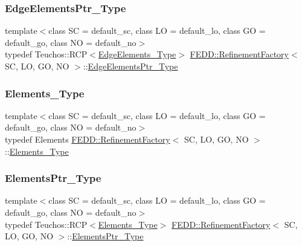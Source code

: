\subsubsection{\texorpdfstring{Edge\+Elements\+Ptr\+\_\+\+Type}{EdgeElementsPtr\_Type}}
{\footnotesize\ttfamily template$<$class SC = default\+\_\+sc, class LO = default\+\_\+lo, class GO = default\+\_\+go, class NO = default\+\_\+no$>$ \\
typedef Teuchos\+::\+R\+CP$<$\hyperlink{classFEDD_1_1RefinementFactory_a11b30196ff403358f3540117f09b6963}{Edge\+Elements\+\_\+\+Type}$>$ \hyperlink{classFEDD_1_1RefinementFactory}{F\+E\+D\+D\+::\+Refinement\+Factory}$<$ SC, LO, GO, NO $>$\+::\hyperlink{classFEDD_1_1RefinementFactory_ae5285e990ec4632d6188a1280627ad13}{Edge\+Elements\+Ptr\+\_\+\+Type}}

\mbox{\label{classFEDD_1_1RefinementFactory_a0879b04ac1b1830fae7d6a7e29d36000}} 
\subsubsection{\texorpdfstring{Elements\+\_\+\+Type}{Elements\_Type}}
{\footnotesize\ttfamily template$<$class SC = default\+\_\+sc, class LO = default\+\_\+lo, class GO = default\+\_\+go, class NO = default\+\_\+no$>$ \\
typedef Elements \hyperlink{classFEDD_1_1RefinementFactory}{F\+E\+D\+D\+::\+Refinement\+Factory}$<$ SC, LO, GO, NO $>$\+::\hyperlink{classFEDD_1_1RefinementFactory_a0879b04ac1b1830fae7d6a7e29d36000}{Elements\+\_\+\+Type}}

\mbox{\label{classFEDD_1_1RefinementFactory_a0994b5b7b6d080048673941251999f2e}} 
\subsubsection{\texorpdfstring{Elements\+Ptr\+\_\+\+Type}{ElementsPtr\_Type}}
{\footnotesize\ttfamily template$<$class SC = default\+\_\+sc, class LO = default\+\_\+lo, class GO = default\+\_\+go, class NO = default\+\_\+no$>$ \\
typedef Teuchos\+::\+R\+CP$<$\hyperlink{classFEDD_1_1RefinementFactory_a0879b04ac1b1830fae7d6a7e29d36000}{Elements\+\_\+\+Type}$>$ \hyperlink{classFEDD_1_1RefinementFactory}{F\+E\+D\+D\+::\+Refinement\+Factory}$<$ SC, LO, GO, NO $>$\+::\hyperlink{classFEDD_1_1RefinementFactory_a0994b5b7b6d080048673941251999f2e}{Elements\+Ptr\+\_\+\+Type}}

